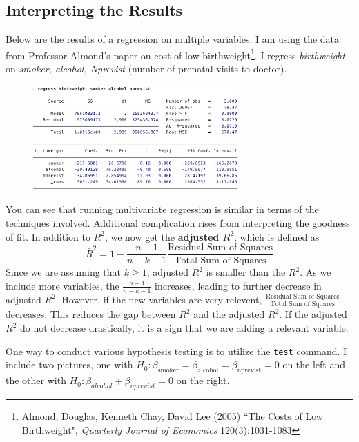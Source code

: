 \documentclass[12pt]{article}
\theoremstyle{definition}
\theoremstyle{property}
\theoremstyle{assumption}
\theoremstyle{example}
\theoremstyle{comment}
\begin{document}
\subsection{Interpreting the Results}
Below are the results of a regression on multiple variables. I am using the data from Professor Almond's paper on cost of low birthweight\footnote{Almond, Douglas, Kenneth Chay, David Lee (2005) ``The Costs of Low Birthweight", \textit{Quarterly Journal of Economics} 120(3):1031-1083}. I regress \textit{birthweight} on \textit{smoker, alcohol, Nprevist} (number of prenatal visits to doctor).
\begin{figure}[H]
\begin{center}
\includegraphics[width=0.7\textwidth]{regoutput.png}
\end{center}
\end{figure}\par\medskip
You can see that running multivariate regression is similar in terms of the techniques involved. Additional complication rises from interpreting the goodness of fit. In addition to $R^2$, we now get the \textbf{adjusted $R^2$}, which is defined as
\[
\bar{R}^2 = 1-\frac{n-1}{n-k-1}\frac{\text{Residual Sum of Squares}}{\text{Total Sum of Squares}}
\]
Since we are assuming that $k\geq 1$, adjusted $R^2$ is smaller than the $R^2$. As we include more variables, the $\frac{n-1}{n-k-1}$ increases, leading to further decrease in adjusted $R^2$. However, if the new variables are very relevent, $\frac{\text{Residual Sum of Squares}}{\text{Total Sum of Squares}}$ decreases. This reduces the gap between $R^2$ and the adjusted $R^2$. If the adjusted $R^2$ do not decrease drastically, it is a sign that we are adding a relevant variable. \par\medskip
One way to conduct various hypothesis testing is to utilize the \texttt{test} command. I include two pictures, one with $H_0: \beta_{\text{smoker}}=\beta_{\text{alcohol}}=\beta_{\text{nprevist}}=0$ on the left and the other with $H_0:\beta_{alcohol}+\beta_{nprevist}=0$ on the right.
\end{document}
